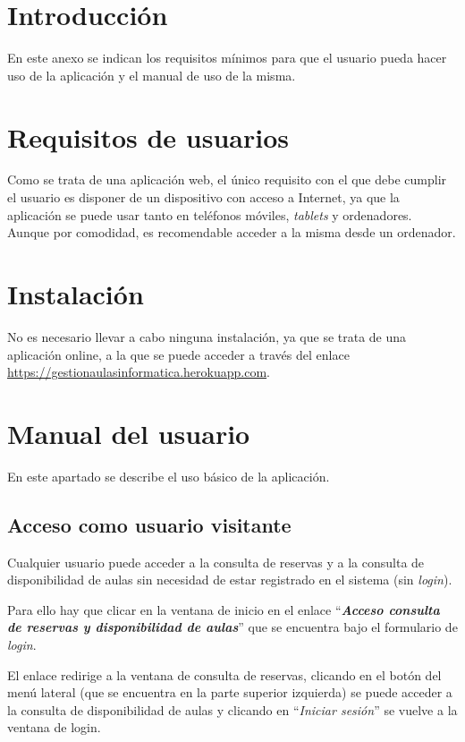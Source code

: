 
\section{Introducción}
En este anexo se indican los requisitos mínimos para que el usuario pueda hacer uso de la aplicación y el manual de uso de la misma.

\section{Requisitos de usuarios}
Como se trata de una aplicación web, el único requisito con el que debe cumplir el usuario es disponer de un dispositivo con acceso a Internet, ya que la aplicación se puede usar tanto en teléfonos móviles, \textit{tablets} y ordenadores. Aunque por comodidad, es recomendable acceder a la misma desde un ordenador.

\section{Instalación}
No es necesario llevar a cabo ninguna instalación, ya que se trata de una aplicación online, a la que se puede acceder a través del enlace \url{https://gestionaulasinformatica.herokuapp.com}.

\section{Manual del usuario}
En este apartado se describe el uso básico de la aplicación.

\subsection{Acceso como usuario visitante}
Cualquier usuario puede acceder a la consulta de reservas y a la consulta de disponibilidad de aulas sin necesidad de estar registrado en el sistema (sin \textit{login}).

Para ello hay que clicar en la ventana de inicio en el enlace ``\textbf{\textit{Acceso consulta de reservas y disponibilidad de aulas}}'' que se encuentra bajo el formulario de \textit{login}.


El enlace redirige a la ventana de consulta de reservas, clicando en el botón del menú lateral (que se encuentra en la parte superior izquierda) se puede acceder a la consulta de disponibilidad de aulas y clicando en ``\textit{Iniciar sesión}'' se vuelve a la ventana de login.

